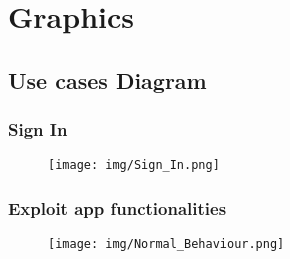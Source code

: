 \section{Graphics}
\label{sec:graph}

\subsection{Use cases Diagram}



\subsubsection{Sign In}

\begin{figure}[h!]

\centering

\hspace*{-2.5cm}
\texttt{[image: img/Sign\_In.png]}


 \label{fig:use_case_signin}

 \end{figure}

\clearpage


\subsubsection{Exploit app functionalities}




\begin{figure}[h!]

\centering

\hspace*{-2.5cm}
\texttt{[image: img/Normal\_Behaviour.png]}


  \label{fig:use_case_normalbehaviour}

 \end{figure}